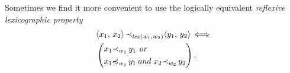 \documentclass[runningheads]{llncs}
\DeclareMathOperator{\uand}{\emph{and}\,}
\DeclareMathOperator{\uor}{\emph{or}\,}
\DeclareMathOperator{\uiff}{\iff}
\DeclareMathOperator{\lex}{\emph{lex}}
\begin{document}

  

 
  Sometimes we find it more convenient to use the logically equivalent \emph{reflexive lexicographic property}
\begin{alignat*}{2}
   \begin{split}
  &\langle \varsub{x}{1}, \,  \varsub{x}{2}\rangle \, \expsub{\prec}{\lex(\expsub{w}{1}, \expsub{w}{2})} 
   \langle \varsub{y}{1}, \,  \varsub{y}{2}\rangle
  \uiff \\
 &\left(\begin{aligned}
  &\varsub{x}{1} \expsub{\prec}{\expsub{w}{1}} \, \varsub{y}{1} \, \uor \, \\
  &\varsub{x}{1} \expsub{\preccurlyeq}{\expsub{w}{1}} \, \expsub{\var{y}}{1}\uand
  \varsub{x}{2} \expsub{\prec}{\expsub{w}{2}} \, \varsub{y}{2}
  \end{aligned}\right).
\end{split}
\end{alignat*}
  
\end{document}
